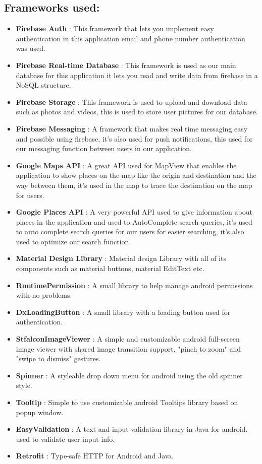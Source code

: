 \subsection{Frameworks used:}
\begin{itemize}
\item \textbf{Firebase Auth }: This framework that lets you implement easy authentication in this application email and phone number authentication was used.
\item \textbf{Firebase Real-time Database }: This framework is used as our main database for this application it lets you read and write data from firebase in a NoSQL structure. 
\item \textbf{Firebase Storage }: This framework is used to upload and download data such as photos and videos, this is used to store user pictures for our database.
\item \textbf{Firebase Messaging }: A framework that makes real time messaging easy and possible using firebase, it’s also used for push notifications, this used for our messaging function between users in our application. 
\item \textbf{ Google Maps API }: A great API used for MapView that enables the application to show places on the map like the origin and destination and the way between them, it’s used in the map to trace the destination on the map for users.
\item \textbf{Google Places API }: A very powerful API used to give information about places in the application and used to AutoComplete search queries, it’s used to auto complete search queries for our users for easier searching, it’s also used to optimize our search function.
\item \textbf{Material Design Library }: Material design Library with all of its components such as material buttons, material EditText etc.
\item \textbf{RuntimePermission }: A small library to help manage android permissions with no problems. 
\item \textbf{DxLoadingButton }: A small library with a loading button used for authentication. 
\item \textbf{StfalconImageViewer }: A simple and customizable android full-screen image viewer with shared image transition support, "pinch to zoom" and "swipe to dismiss" gestures.
\item \textbf{Spinner }: A styleable drop down menu for android using the old spinner style. 
\item \textbf{Tooltip }: Simple to use customizable android Tooltips library based on popup window. 
\item \textbf{EasyValidation }: A text and input validation library in Java for android. used to validate user input info.
\item \textbf{Retrofit }: Type-safe HTTP for Android and Java.
\end{itemize}


